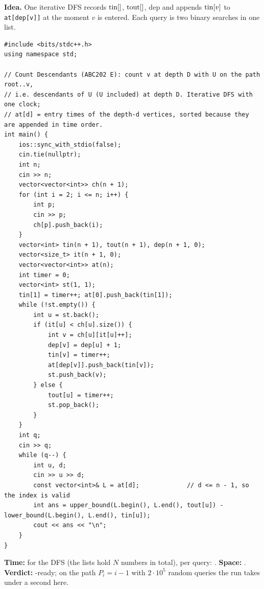 \begin{algorithmbox}
\textbf{Idea.} One iterative DFS records $\mathrm{tin}[]$, $\mathrm{tout}[]$, $\mathrm{dep}$ and appends $\mathrm{tin}[v]$ to \texttt{at[dep[v]]} at the moment $v$ is entered. Each query is two binary searches in one list.

\begin{lstlisting}[style=cpp]
#include <bits/stdc++.h>
using namespace std;

// Count Descendants (ABC202 E): count v at depth D with U on the path root..v,
// i.e. descendants of U (U included) at depth D. Iterative DFS with one clock;
// at[d] = entry times of the depth-d vertices, sorted because they are appended in time order.
int main() {
    ios::sync_with_stdio(false);
    cin.tie(nullptr);
    int n;
    cin >> n;
    vector<vector<int>> ch(n + 1);
    for (int i = 2; i <= n; i++) {
        int p;
        cin >> p;
        ch[p].push_back(i);
    }
    vector<int> tin(n + 1), tout(n + 1), dep(n + 1, 0);
    vector<size_t> it(n + 1, 0);
    vector<vector<int>> at(n);
    int timer = 0;
    vector<int> st(1, 1);
    tin[1] = timer++; at[0].push_back(tin[1]);
    while (!st.empty()) {
        int u = st.back();
        if (it[u] < ch[u].size()) {
            int v = ch[u][it[u]++];
            dep[v] = dep[u] + 1;
            tin[v] = timer++;
            at[dep[v]].push_back(tin[v]);
            st.push_back(v);
        } else {
            tout[u] = timer++;
            st.pop_back();
        }
    }
    int q;
    cin >> q;
    while (q--) {
        int u, d;
        cin >> u >> d;
        const vector<int>& L = at[d];             // d <= n - 1, so the index is valid
        int ans = upper_bound(L.begin(), L.end(), tout[u]) - lower_bound(L.begin(), L.end(), tin[u]);
        cout << ans << "\n";
    }
}
\end{lstlisting}

\begin{complexitybox}
\textbf{Time:}  for the DFS (the lists hold $N$ numbers in total),  per query: . \textbf{Space:} . \textbf{Verdict:} \ac{}-ready; on the path $P_i = i-1$ with $2\cdot10^5$ random queries the run takes under a second here.
\end{complexitybox}
\end{algorithmbox}

